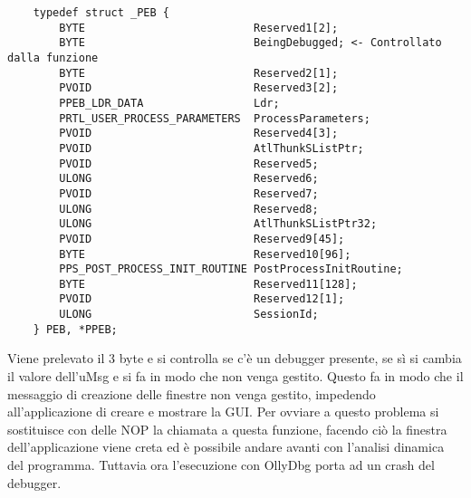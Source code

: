 \documentclass[a4paper,12pt]{article}
\begin{document}
\begin{verbatim}
	typedef struct _PEB {
		BYTE                          Reserved1[2];
		BYTE                          BeingDebugged; <- Controllato dalla funzione
		BYTE                          Reserved2[1];
		PVOID                         Reserved3[2];
		PPEB_LDR_DATA                 Ldr;
		PRTL_USER_PROCESS_PARAMETERS  ProcessParameters;
		PVOID                         Reserved4[3];
		PVOID                         AtlThunkSListPtr;
		PVOID                         Reserved5;
		ULONG                         Reserved6;
		PVOID                         Reserved7;
		ULONG                         Reserved8;
		ULONG                         AtlThunkSListPtr32;
		PVOID                         Reserved9[45];
		BYTE                          Reserved10[96];
		PPS_POST_PROCESS_INIT_ROUTINE PostProcessInitRoutine;
		BYTE                          Reserved11[128];
		PVOID                         Reserved12[1];
		ULONG                         SessionId;
	} PEB, *PPEB;
\end{verbatim}

 Viene prelevato il 3 byte e si controlla se c'è un debugger presente, se sì si cambia il valore dell'uMsg e si fa in modo che non venga gestito. Questo fa in modo che il messaggio di creazione delle finestre non venga gestito, impedendo all'applicazione di creare e mostrare la GUI. Per ovviare a questo problema si sostituisce con delle NOP la chiamata a questa funzione, facendo ciò la finestra dell'applicazione viene creta ed è possibile andare avanti con l'analisi dinamica del programma. Tuttavia ora l'esecuzione con OllyDbg porta ad un crash del debugger.
\end{document}

